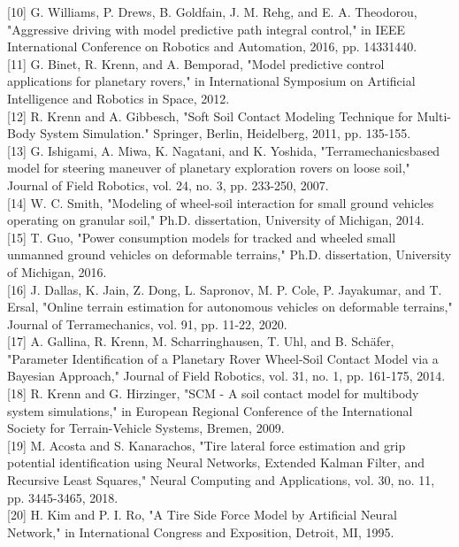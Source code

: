 \documentclass[10pt]{article}
\begin{document}
[10] G. Williams, P. Drews, B. Goldfain, J. M. Rehg, and E. A. Theodorou, "Aggressive driving with model predictive path integral control," in IEEE International Conference on Robotics and Automation, 2016, pp. 14331440.\\[0pt]
[11] G. Binet, R. Krenn, and A. Bemporad, "Model predictive control applications for planetary rovers," in International Symposium on Artificial Intelligence and Robotics in Space, 2012.\\[0pt]
[12] R. Krenn and A. Gibbesch, "Soft Soil Contact Modeling Technique for Multi-Body System Simulation." Springer, Berlin, Heidelberg, 2011, pp. 135-155.\\[0pt]
[13] G. Ishigami, A. Miwa, K. Nagatani, and K. Yoshida, "Terramechanicsbased model for steering maneuver of planetary exploration rovers on loose soil," Journal of Field Robotics, vol. 24, no. 3, pp. 233-250, 2007.\\[0pt]
[14] W. C. Smith, "Modeling of wheel-soil interaction for small ground vehicles operating on granular soil," Ph.D. dissertation, University of Michigan, 2014.\\[0pt]
[15] T. Guo, "Power consumption models for tracked and wheeled small unmanned ground vehicles on deformable terrains," Ph.D. dissertation, University of Michigan, 2016.\\[0pt]
[16] J. Dallas, K. Jain, Z. Dong, L. Sapronov, M. P. Cole, P. Jayakumar, and T. Ersal, "Online terrain estimation for autonomous vehicles on deformable terrains," Journal of Terramechanics, vol. 91, pp. 11-22, 2020.\\[0pt]
[17] A. Gallina, R. Krenn, M. Scharringhausen, T. Uhl, and B. Schäfer, "Parameter Identification of a Planetary Rover Wheel-Soil Contact Model via a Bayesian Approach," Journal of Field Robotics, vol. 31, no. 1, pp. 161-175, 2014.\\[0pt]
[18] R. Krenn and G. Hirzinger, "SCM - A soil contact model for multibody system simulations," in European Regional Conference of the International Society for Terrain-Vehicle Systems, Bremen, 2009.\\[0pt]
[19] M. Acosta and S. Kanarachos, "Tire lateral force estimation and grip potential identification using Neural Networks, Extended Kalman Filter, and Recursive Least Squares," Neural Computing and Applications, vol. 30, no. 11, pp. 3445-3465, 2018.\\[0pt]
[20] H. Kim and P. I. Ro, "A Tire Side Force Model by Artificial Neural Network," in International Congress and Exposition, Detroit, MI, 1995.\\[0pt]
\end{document}
